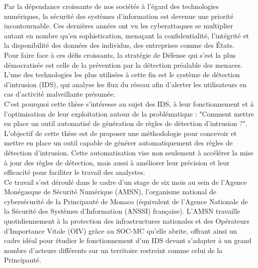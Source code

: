 %
%

Par la dépendance croissante de nos sociétés à l'égard des technologies numériques, la sécurité des systèmes d'information est devenue une priorité incontournable. Ces dernières années ont vu les cyberattaques se multiplier autant en nombre qu'en sophistication, menaçant la confidentialité, l'intégrité et la disponibilité des données des individus, des entreprises comme des États. \\

Pour faire face à ces défis croissants, la stratégie de Défense qui s'est la plus démocratisée est celle de la prévention par la détection préalable des menaces. L'une des technologies les plus utilisées à cette fin est le système de détection d'intrusion (IDS), qui analyse les flux du réseau afin d'alerter les utilisateurs en cas d'activité malveillante présumée.\\

C'est pourquoi cette thèse s'intéresse au sujet des IDS, à leur fonctionnement et à l'optimisation de leur exploitation autour de la problématique : "Comment mettre en place un outil automatisé de génération
de règles de détection d’intrusion ?".\\ L'objectif de cette thèse est de proposer une méthodologie pour concevoir et mettre en place un outil capable de générer automatiquement des règles de détection d'intrusion. Cette automatisation vise non seulement à accélérer la mise à jour des règles de détection, mais aussi à améliorer leur précision et leur efficacité pour faciliter le travail des analystes.\\

Ce travail s'est déroulé dans le cadre d'un stage de six mois au sein de l'Agence Monégasque de Sécurité Numérique (AMSN), l'organisme national de cybersécurité de la Principauté de Monaco (équivalent de l'Agence Nationale de la Sécurité des Systèmes d'Information (ANSSI) française). L'AMSN travaille quotidiennement à la protection des infrastructures nationales et des Opérateurs d'Importance Vitale (OIV) grâce au SOC-MC qu'elle abrite, offrant ainsi un cadre idéal pour étudier le fonctionnement d'un IDS devant s'adapter à un grand nombre d'acteurs différents sur un territoire restreint comme celui de la Principauté.\\

